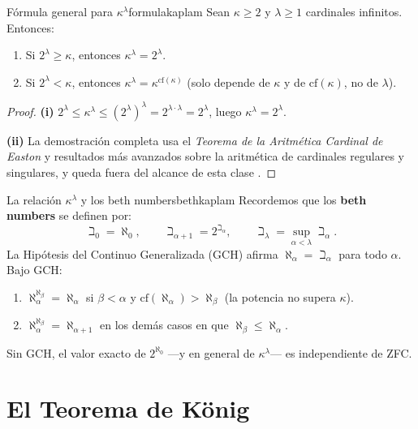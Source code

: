 \begin{proposicion}{Fórmula general para $\kappa^\lambda$}{formulakaplam}
Sean $\kappa \geq 2$ y $\lambda \geq 1$ cardinales infinitos. Entonces:
\begin{enumerate}[leftmargin=2em, label=(\roman*)]
  \item Si $2^\lambda \geq \kappa$, entonces $\kappa^\lambda = 2^\lambda$.
  \item Si $2^\lambda < \kappa$, entonces $\kappa^\lambda = \kappa^{\mathrm{cf}(\kappa)}$ (solo depende de $\kappa$ y de $\mathrm{cf}(\kappa)$, no de $\lambda$).
\end{enumerate}
\end{proposicion}

\begin{proof}
\textbf{(i)} $2^\lambda \leq \kappa^\lambda \leq (2^\lambda)^\lambda = 2^{\lambda \cdot \lambda} = 2^\lambda$, luego $\kappa^\lambda = 2^\lambda$.

\textbf{(ii)} La demostración completa usa el \emph{Teorema de la Aritmética Cardinal de Easton} y resultados más avanzados sobre la aritmética de cardinales regulares y singulares, y queda fuera del alcance de esta clase \cite{jech2003, shelah1994}.
\end{proof}

\begin{ejemplo}{La relación $\kappa^\lambda$ y los beth numbers}{bethkaplam}
Recordemos que los \textbf{beth numbers} se definen por:
\[
  \beth_0 = \aleph_0, \qquad \beth_{\alpha+1} = 2^{\beth_\alpha}, \qquad \beth_\lambda = \sup_{\alpha < \lambda} \beth_\alpha.
\]
La Hipótesis del Continuo Generalizada (GCH) afirma $\aleph_\alpha = \beth_\alpha$ para todo $\alpha$. Bajo GCH:
\begin{enumerate}[leftmargin=2em, label=(\alph*)]
  \item $\aleph_\alpha^{\aleph_\beta} = \aleph_\alpha$ si $\beta < \alpha$ y $\mathrm{cf}(\aleph_\alpha) > \aleph_\beta$ (la potencia no supera $\kappa$).
  \item $\aleph_\alpha^{\aleph_\beta} = \aleph_{\alpha+1}$ en los demás casos en que $\aleph_\beta \leq \aleph_\alpha$.
\end{enumerate}
Sin GCH, el valor exacto de $2^{\aleph_0}$ —y en general de $\kappa^\lambda$— es independiente de ZFC.
\end{ejemplo}

\section{El Teorema de König}

